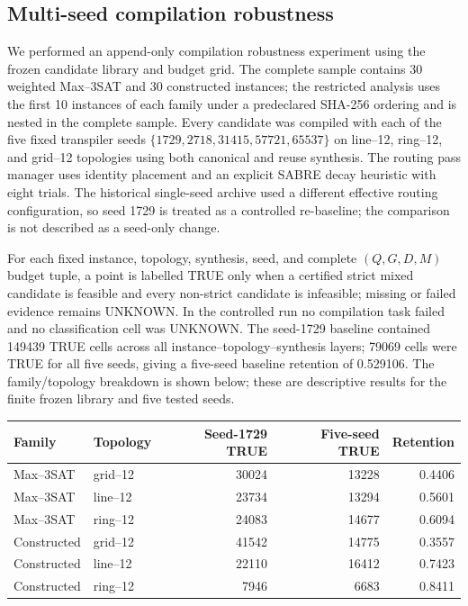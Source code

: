 \documentclass[a4paper,onecolumn,11pt,unpublished]{quantumarticle}
\theoremstyle{remark}
\begin{document}
\subsection{Multi-seed compilation robustness}
\label{sec:multiseed-robustness}
We performed an append-only compilation robustness experiment using the frozen
candidate library and budget grid.  The complete sample contains 30 weighted
Max--3SAT and 30 constructed instances; the restricted analysis uses the first
10 instances of each family under a predeclared SHA-256 ordering and is nested
in the complete sample.  Every candidate was compiled with each of the five
fixed transpiler seeds $\{1729,2718,31415,57721,65537\}$ on line--12, ring--12,
and grid--12 topologies using both canonical and reuse synthesis.  The routing
pass manager uses identity placement and an explicit SABRE decay heuristic with
eight trials.  The historical single-seed archive used a different effective
routing configuration, so seed 1729 is treated as a controlled re-baseline;
the comparison is not described as a seed-only change.

For each fixed instance, topology, synthesis, seed, and complete $(Q,G,D,M)$
budget tuple, a point is labelled TRUE only when a certified strict mixed
candidate is feasible and every non-strict candidate is infeasible; missing
or failed evidence remains UNKNOWN.  In the controlled run no compilation
task failed and no classification cell was UNKNOWN.  The seed-1729 baseline
contained 149439 TRUE cells across all instance--topology--synthesis layers;
79069 cells were TRUE for all five seeds, giving a five-seed baseline retention of 0.529106.
The family/topology breakdown is shown below; these are descriptive results
for the finite frozen library and five tested seeds.

\begin{center}
\begin{tabular}{llrrr}
\toprule
Family & Topology & Seed-1729 TRUE & Five-seed TRUE & Retention\\
\midrule
Max--3SAT & grid--12 & 30024 & 13228 & 0.4406\\
Max--3SAT & line--12 & 23734 & 13294 & 0.5601\\
Max--3SAT & ring--12 & 24083 & 14677 & 0.6094\\
Constructed & grid--12 & 41542 & 14775 & 0.3557\\
Constructed & line--12 & 22110 & 16412 & 0.7423\\
Constructed & ring--12 & 7946 & 6683 & 0.8411\\
\bottomrule
\end{tabular}
\end{center}
\end{document}
